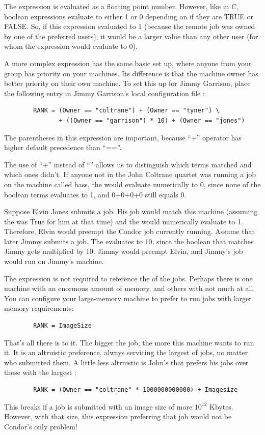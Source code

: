 The  expression is evaluated as a floating point number.
However, like in C, boolean expressions evaluate to either 1 or 0
depending on if they are TRUE or FALSE.
So, if this expression
evaluated to 1 (because the remote job was owned by one of the 
preferred users), it would be a larger value than any other
user (for whom the expression would evaluate to 0).

A more complex  expression
has the same basic set up,
where anyone from your group has priority on your machines.
Its difference is that
the machine owner has better priority on their own machine.
To set this up for Jimmy Garrison,
place the following entry in Jimmy Garrison's local
configuration file :
\begin{verbatim}
        RANK = (Owner == "coltrane") + (Owner == "tyner") \
               + ((Owner == "garrison") * 10) + (Owner == "jones")
\end{verbatim}
\Note The parentheses in this expression are important, because ``+''
      operator has higher default precedence than ``==''.

The use of ``+'' instead of ``\Bar\Bar'' allows us to 
distinguish which terms matched and which ones didn't.
If anyone not in the John Coltrane quartet was running a job on
the machine called bass,
the  would evaluate numerically to 0, since none
of the boolean terms evaluates to 1, and 0+0+0+0 still equals 0.

Suppose Elvin Jones submits a job.
His job would match this
machine (assuming the  was True for him at that time) and
the \Expr{RANK} would numerically evaluate to 1.
Therefore, Elvin would preempt the Condor job currently running.
Assume that later Jimmy submits a job.
The  evaluates to 10, since the boolean that matches Jimmy
gets multiplied by 10.
Jimmy would preempt Elvin, and Jimmy's job would run on
Jimmy's machine.

The  expression is not required to reference the
 of the jobs.
Perhaps there is one machine with an enormous amount of memory,
and others with not much at all.
You can configure your
large-memory machine to prefer to run jobs with larger memory
requirements:
\begin{verbatim}
        RANK = ImageSize
\end{verbatim}

That's all there is to it.
The bigger the job, the more this machine
wants to run it.
It is an altruistic preference, always servicing
the largest of jobs, no matter who submitted them.
A little less altruistic is John's  that
prefers his jobs over those with the largest
:
\begin{verbatim}
        RANK = (Owner == "coltrane" * 1000000000000) + Imagesize
\end{verbatim}
This  breaks if a job is submitted with an image
size of more $10^{12}$ Kbytes.
However, with that size, this  expression
preferring that job would not be Condor's
only problem! 


